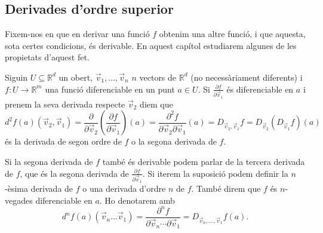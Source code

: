 \documentclass[../Apunts.tex]{subfiles}
\begin{document}
	\subsection{Derivades d'ordre superior}
	Fixem-nos en que en derivar una funció \(f\) obtenim una altre funció, i que aquesta, sota certes condicions, és derivable. En aquest capítol estudiarem algunes de les propietats d'aquest fet.
	\begin{definition}
		\label{def:n-èsima derivada d'una funció}
		Siguin \(U\subseteq\mathbb{R}^{d}\) un obert, \(\vec{v}_{1},\dots,\vec{v}_{n}\) \(n\) vectors de \(\mathbb{R}^{d}\) (no necessàriament diferents) i \(f\colon U\to\mathbb{R}^{m}\) una funció diferenciable en un punt \(a\in U\). Si \(\frac{\partial f}{\partial \vec{v}_{1}}\) és diferenciable en \(a\) i prenem la seva derivada respecte \(\vec{v}_{2}\) diem que
		\[d^{2}f(a)(\vec{v}_{2},\vec{v}_{1})=\frac{\partial}{\partial \vec{v}_{2}}\left(\frac{\partial f}{\partial \vec{v}_{1}}\right)(a)=\frac{\partial^{2}f}{\partial \vec{v}_{2}\partial \vec{v}_{1}}(a)=D_{\vec{v}_{2},\vec{v}_{1}}f=D_{\vec{v}_{2}}(D_{\vec{v}_{1}}f)(a)\]
		és la derivada de segon ordre de \(f\) o la segona derivada de \(f\).
		
		Si la segona derivada de \(f\) també és derivable podem parlar de la tercera derivada de \(f\), que és la segona derivada de \(\frac{\partial f}{\partial \vec{v}_{1}}\). Si iterem la suposició podem definir la \(n\)-èsima derivada de \(f\) o una derivada d'ordre \(n\) de \(f\). També direm que \(f\) és \(n\)-vegades diferenciable en \(a\). Ho denotarem amb
		\[d^{n}f(a)(\vec{v}_{n}\dots\vec{v}_{1})=\frac{\partial^{n}f}{\partial \vec{v}_{n}\cdots\partial\vec{v}_{1}}=D_{\vec{v}_{n},\dots,\vec{v}_{1}}f(a).\]
	\end{definition}
\end{document}
